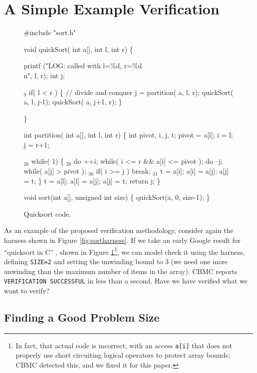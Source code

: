 \documentclass[conference]{IEEEtran}
\begin{document}
\section{A Simple Example Verification}

\begin{figure}
{\scriptsize
\begin{code}
 \#include "sort.h"

 void quickSort( int a[], int l, int r)
 \{

   printf ("LOG: called with l=\%d, r=\%d\\n", l, r); 
   int j;

{$_9$}  if( l < r ) 
     \{
       // divide and conquer
       j = partition( a, l, r);
       quickSort( a, l, j-1);
       quickSort( a, j+1, r);
     \}
  
 \}

 int partition( int a[], int l, int r) \{
   int pivot, i, j, t;
   pivot = a[l];
   i = l; j = r+1;
  
{$_{26}$} while( 1)
     \{
{$_{28}$}     do ++i; while( i <= r \&\& a[i] <= pivot );
       do --j; while( a[j] > pivot );
{$_{30}$}     if( i >= j ) break;
{$_{31}$}     t = a[i]; a[i] = a[j]; a[j] = t;
     \}
   t = a[l]; a[l] = a[j]; a[j] = t;
   return j;
 \}


 void sort(int a[], unsigned int size) \{
   quickSort(a, 0, size-1);
 \}
\end{code}
}
\caption{Quicksort code.}
\label{fig:qsort}
\end{figure}

As an example of the proposed verification methodology, consider again
the harness shown in Figure \ref{fig:sortharness}.  If we take an
early Google result for ``quicksort in C'' \cite{quicksortcode},
shown in Figure \ref{fig:qsort}\footnote{In fact, that actual code is
  incorrect, with an access {\tt a[i]} that does not properly use
  short circuiting logical operators to protect array bounds; CBMC
  detected this, and we fixed it for this paper.}, we can model check
it using the harness, defining {\tt SIZE=2} and setting the unwinding
bound to 3 (we need one more unwinding than the maximum
number of items in the array).  CBMC reports {\tt VERIFICATION
  SUCCESSFUL} in less than a second.  Have we have verified
what we want to verify?

\subsection{Finding a Good Problem Size}
\label{sec:unwind}
\end{document}
